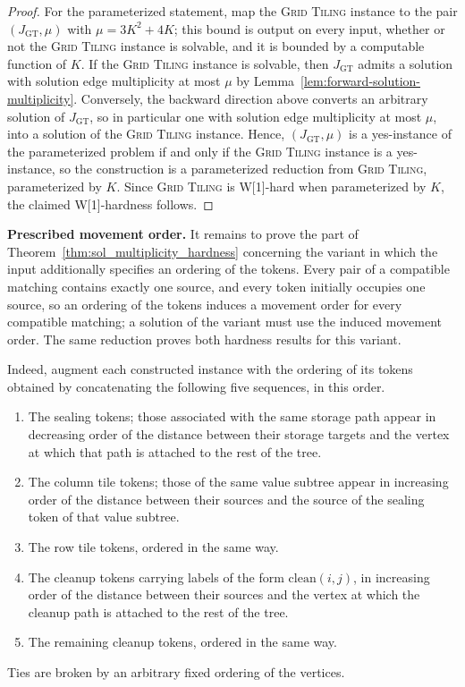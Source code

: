 \documentclass[a4paper,USenglish,thm-restate]{lipics-v2021}
\theoremstyle{problemstyle}
\begin{document}
\begin{proof}
For the parameterized statement, map the \textsc{Grid Tiling} instance to
the pair $(J_{\mathrm{GT}},\mu)$ with $\mu=3K^2+4K$; this bound is output on every input,
whether or not the \textsc{Grid Tiling} instance is solvable, and it is
bounded by a computable function of $K$. If the \textsc{Grid Tiling}
instance is solvable, then $J_{\mathrm{GT}}$ admits a solution with solution edge
multiplicity at most $\mu$ by
Lemma~\ref{lem:forward-solution-multiplicity}. Conversely, the backward direction above converts an arbitrary solution of $J_{\mathrm{GT}}$, so in particular
one with solution edge multiplicity at most $\mu$, into a solution of the
\textsc{Grid Tiling} instance. Hence, $(J_{\mathrm{GT}},\mu)$ is a yes-instance of the
parameterized problem if and only if the \textsc{Grid Tiling} instance is a
yes-instance, so the construction is a parameterized reduction from
\textsc{Grid Tiling}, parameterized by $K$. Since \textsc{Grid Tiling} is
\textsf{W}[1]-hard when parameterized by $K$, the claimed
\textsf{W}[1]-hardness follows.
\end{proof}

\smallskip
\noindent\textbf{Prescribed movement order.}
It remains to prove the part of
Theorem~\ref{thm:sol_multiplicity_hardness} concerning the variant in which
the input additionally specifies an ordering of the tokens. Every pair of a
compatible matching contains exactly one source, and every token initially
occupies one source, so an ordering of the tokens induces a movement order
for every compatible matching; a solution of the variant must use the
induced movement order. The same reduction proves both hardness results for
this variant.

Indeed, augment each constructed instance with the ordering of its tokens
obtained by concatenating the following five sequences, in this order.
\begin{enumerate}
\item The sealing tokens; those associated with the same storage path
appear in decreasing order of the distance between their storage targets
and the vertex at which that path is attached to the rest of the tree.
\item The column tile tokens; those of the same value subtree appear in
increasing order of the distance between their sources and the source of
the sealing token of that value subtree.
\item The row tile tokens, ordered in the same way.
\item The cleanup tokens carrying labels of the form $\mathrm{clean}(i,j)$,
in increasing order of the distance between their sources and the vertex at
which the cleanup path is attached to the rest of the tree.
\item The remaining cleanup tokens, ordered in the same way.
\end{enumerate}
Ties are broken by an arbitrary fixed ordering of the vertices.
\end{document}
